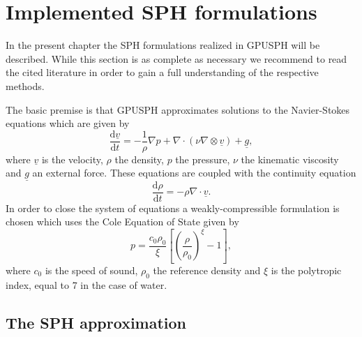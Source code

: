 \documentclass[12pt]{memoir}
\newcommand{\uvec}[1]{\underline{#1}}
\newcommand{\td}{\text{d}}
\newcommand{\tdv}[2]{\frac{\td #1}{\td #2}}
\begin{document}

\chapter{Implemented SPH formulations}

In the present chapter the SPH formulations realized in GPUSPH will be
described. While this section is as complete as necessary we recommend
to read the cited literature in order to gain a full understanding of
the respective methods.

The basic premise is that GPUSPH approximates solutions to the
Navier-Stokes equations which are given by
\begin{equation}
\tdv{\uvec{v}}{t} = -\frac{1}{\rho}\nabla p + \nabla \cdot (\nu
\nabla \otimes \uvec{v}) + \uvec{g},
\label{e:sph:ns}
\end{equation}
where $\uvec{v}$ is the velocity, $\rho$ the density, $p$ the
pressure, $\nu$ the kinematic viscosity and $\uvec{g}$ an external
force. These equations are coupled with the continuity equation
\begin{equation}
\tdv{\rho}{t} = - \rho \nabla \cdot \uvec{v}.
\label{e:sph:cont}
\end{equation}
In order to close the system of equations a weakly-compressible
formulation is chosen which uses the Cole Equation of State given by
\begin{equation}
p = \frac{c_0 \rho_0}{\xi}\left[ \left( \frac{\rho}{\rho_0}\right)^\xi
-1 \right],
\label{e:sph:eos}
\end{equation}
where $c_0$ is the speed of sound, $\rho_0$ the reference density and
$\xi$ is the polytropic index, equal to 7 in the case of water.

\section{The SPH approximation}
\end{document}
